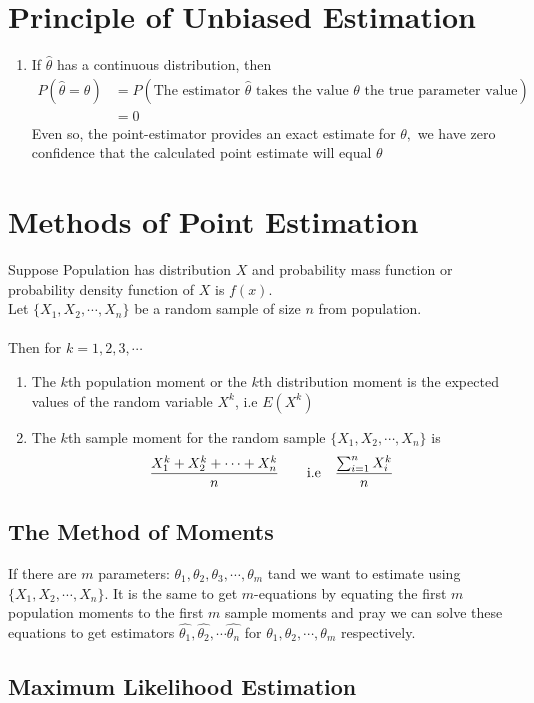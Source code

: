 \section[Principle of Unbiased Estimation]{Principle of Unbiased Estimation}






\note \begin{enumerate}
\item If $\widehat{\theta}$ has a continuous distribution, then \begin{align*}
P(\widehat{\theta}=\theta)&=P(\text{The estimator }\widehat{\theta}\text{ takes the value }\theta \text{ the true parameter value})\\
&=0
\end{align*}
Even so, the point-estimator provides an exact estimate for $\theta,$ we have zero confidence that the calculated point estimate will equal $\theta$
\end{enumerate}
\section[Methods of Point Estimation]{Methods of Point Estimation}
Suppose Population has distribution $X$ and probability mass function or probability density function of $X$ is $f(x)$.\\
Let $\{X_1,X_2,\cdots,X_n\}$ be a random sample of size $n$ from population.\\
\hfill\\
Then for $k=1,2,3,\cdots$\begin{enumerate}
\item The $k$th population moment or the $k$th distribution moment is the expected values of the random variable $X^k$, i.e $E(X^k)$
\item The $k$th sample moment for the random sample $\{X_1,X_2,\cdots,X_n\}$ is \begin{align*}
\frac{X_1^k+X_2^k+\cdots+X_n^k}{n} \text{\qquad i.e\quad}\frac{\sum_{i=1}^nX_i^k}{n}
\end{align*}
\end{enumerate}
\subsection[The Method of Moments]{The Method of Moments}
If there are $m$ parameters: $\theta_1,\theta_2,\theta_3,\cdots,\theta_m$ tand we want to estimate using $\{X_1,X_2,\cdots,X_n\}$. It is the same to get $m$-equations by equating the first $m$ population moments to the first $m$ sample moments and pray we can solve these equations to get estimators $\widehat{\theta_1},\widehat{\theta_2},\cdots \widehat{\theta_n}$ for $\theta_1,\theta_2,\cdots,\theta_m$ respectively.\\



\subsection[Maximum Likelihood Estimation]{Maximum Likelihood Estimation}




